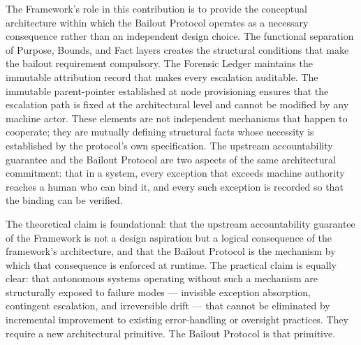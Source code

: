 The \bxthree{} Framework's role in this contribution is to provide the conceptual architecture within which the Bailout Protocol operates as a necessary consequence rather than an independent design choice. The functional separation of Purpose, Bounds, and Fact layers creates the structural conditions that make the bailout requirement compulsory. The Forensic Ledger maintains the immutable attribution record that makes every escalation auditable. The immutable parent-pointer established at node provisioning ensures that the escalation path is fixed at the architectural level and cannot be modified by any machine actor. These elements are not independent mechanisms that happen to cooperate; they are mutually defining structural facts whose necessity is established by the protocol's own specification. The upstream accountability guarantee and the Bailout Protocol are two aspects of the same architectural commitment: that in a \bxthree{} system, every exception that exceeds machine authority reaches a human who can bind it, and every such exception is recorded so that the binding can be verified.

The theoretical claim is foundational: that the upstream accountability guarantee of the \bxthree{} Framework is not a design aspiration but a logical consequence of the framework's architecture, and that the Bailout Protocol is the mechanism by which that consequence is enforced at runtime. The practical claim is equally clear: that autonomous systems operating without such a mechanism are structurally exposed to failure modes --- invisible exception absorption, contingent escalation, and irreversible drift --- that cannot be eliminated by incremental improvement to existing error-handling or oversight practices. They require a new architectural primitive. The Bailout Protocol is that primitive.